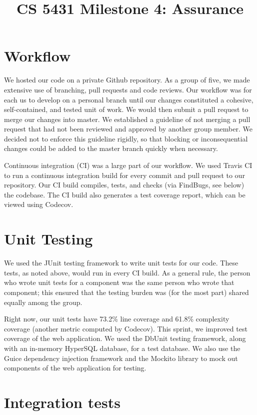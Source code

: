 \documentclass[a4paper,12pt]{article}
\title{CS 5431 Milestone 4: Assurance}
\author{
\iam{James Cassell}{jcc384}
\and
\iam{Evan King}{esk79}
\and
\iam{Ethan Koenig}{etk39}
\and
\iam{Eric Perdew}{ecp84}
\and
\iam{Will Ronchetti}{wrr33}
}
\begin{document}
\maketitle

\section{Workflow}
We hosted our code on a private Github repository. As a group of five, we made extensive use of branching, pull requests and code reviews. Our workflow was for each us to develop on a personal branch until our changes constituted a cohesive, self-contained, and tested unit of work. We would then submit a pull request to merge our changes into master. We established a guideline of not merging a pull request that had not been reviewed and approved by another group member. We decided not to enforce this guideline rigidly, so that blocking or inconsequential changes could be added to the master branch quickly when necessary.

Continuous integration (CI) was a large part of our workflow. We used Travis CI to run a continuous integration build for every commit and pull request to our repository. Our CI build compiles, tests, and checks (via FindBugs, see below) the codebase. The CI build also generates a test coverage report, which can be viewed using Codecov.

\section{Unit Testing}

We used the JUnit testing framework to write unit tests for our code. These tests, as noted above, would run in every CI build. As a general rule, the person who wrote unit tests for a component was the same person who wrote that component; this ensured that the testing burden was (for the most part) shared equally among the group.

Right now, our unit tests have 73.2\% line coverage and 61.8\% complexity coverage (another metric computed by Codecov). This sprint, we improved test coverage of the web application. We used the DbUnit testing framework, along with an in-memory HyperSQL database, for a test database. We also use the Guice dependency injection framework and the Mockito library to mock out components of the web application for testing.

\section{Integration tests}
\end{document}
